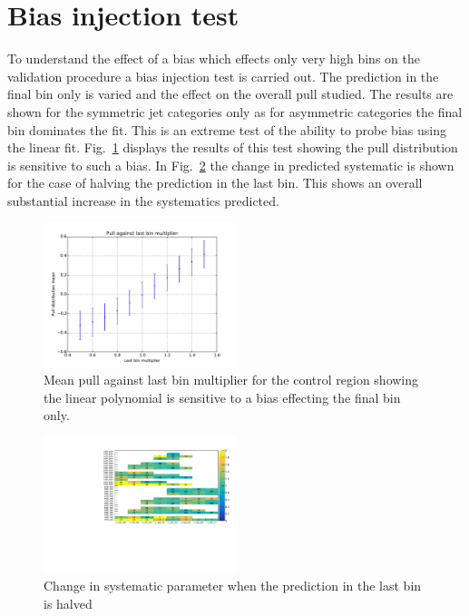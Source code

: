 \section{Bias injection test}

\label{sec:bias_injection}
To understand the effect of a bias which effects only very high 
\mht bins on the validation procedure a bias injection test is carried out.
The prediction in the final bin only is varied and the effect on the 
overall pull studied. The results are shown for the symmetric jet categories only
as for asymmetric categories the final \mht bin dominates the fit. This is 
an extreme test of the ability to probe bias using the linear fit. 
Fig.~\ref{fig:biasInjTest} displays the results of this test showing
the pull distribution is sensitive to such a bias. In Fig.~\ref{fig:biasSyst} the 
change in predicted systematic is shown for the case of halving the prediction in the last bin. 
This shows an overall substantial increase in the systematics predicted.

\begin{figure}[h!]
  \centering
  \includegraphics[width=0.5\textwidth]{figures/template/biasInjTest.pdf}
  \caption{\label{fig:biasInjTest} Mean pull against last bin multiplier for 
  the \mj control region showing the linear polynomial is sensitive to a bias effecting the final bin only.}
\end{figure}
\begin{figure}[h!]
  \centering
  \includegraphics[width=0.5\textwidth]{figures/template/biasSystTest.pdf}
  \caption{\label{fig:biasSyst} Change in systematic parameter when the prediction in the last bin
  is halved}
\end{figure}
